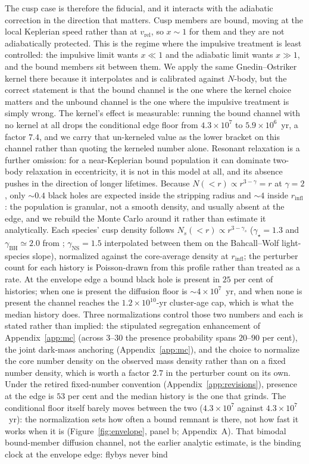 \documentclass[11pt]{article}
\begin{document}
The cusp case is therefore the fiducial, and it interacts with the adiabatic correction in the direction that matters. Cusp members are bound, moving at the local Keplerian speed rather than at $v_{\mathrm{rel}}$, so $x \sim 1$ for them and they are not adiabatically protected. This is the regime where the impulsive treatment is least controlled: the impulsive limit wants $x \ll 1$ and the adiabatic limit wants $x \gg 1$, and the bound members sit between them. We apply the same Gnedin--Ostriker kernel there because it interpolates and is calibrated against $N$-body, but the correct statement is that the bound channel is the one where the kernel choice matters and the unbound channel is the one where the impulsive treatment is simply wrong. The kernel's effect is measurable: running the bound channel with no kernel at all drops the conditional edge floor from $4.3\times10^{7}$ to $5.9\times10^{6}$~yr, a factor $7.4$, and we carry that un-kerneled value as the lower bracket on this channel rather than quoting the kerneled number alone. Resonant relaxation is a further omission: for a near-Keplerian bound population it can dominate two-body relaxation in eccentricity, it is not in this model at all, and its absence pushes in the direction of longer lifetimes. Because $N(<r) \propto r^{3-\gamma} = r$ at $\gamma = 2$, only $\sim 0.4$ black holes are expected inside the stripping radius and $\sim 4$ inside $r_{\mathrm{infl}}$: the population is granular, not a smooth density, and usually absent at the edge, and we rebuild the Monte Carlo around it rather than estimate it analytically. Each species' cusp density follows $N_{s}(<r) \propto r^{3-\gamma_{s}}$ ($\gamma_{\star} = 1.3$ and $\gamma_{\mathrm{BH}} \simeq 2.0$ from \citealt{GonzalezPrieto2025}; $\gamma_{\mathrm{NS}} = 1.5$ interpolated between them on the Bahcall--Wolf light-species slope), normalized against the core-average density at $r_{\mathrm{infl}}$; the perturber count for each history is Poisson-drawn from this profile rather than treated as a rate. At the envelope edge a bound black hole is present in $25$ per cent of histories; when one is present the diffusion floor is $\sim 4\times10^{7}$~yr, and when none is present the channel reaches the $1.2\times10^{10}$-yr cluster-age cap, which is what the median history does. Three normalizations control those two numbers and each is stated rather than implied: the stipulated segregation enhancement of Appendix~\ref{app:mc} (across $3$--$30$ the presence probability spans $20$--$90$ per cent), the joint dark-mass anchoring (Appendix~\ref{app:mc}), and the choice to normalize the core number density on the observed mass density rather than on a fixed number density, which is worth a factor $2.7$ in the perturber count on its own. Under the retired fixed-number convention (Appendix~\ref{app:revisions}), presence at the edge is $53$ per cent and the median history is the one that grinds. The conditional floor itself barely moves between the two ($4.3\times10^{7}$ against $4.3\times10^{7}$~yr): the normalization sets how often a bound remnant is there, not how fast it works when it is (Figure~\ref{fig:envelope}, panel b; Appendix~A). That bimodal bound-member diffusion channel, not the earlier analytic estimate, is the binding clock at the envelope edge: flybys never bind 
\end{document}
